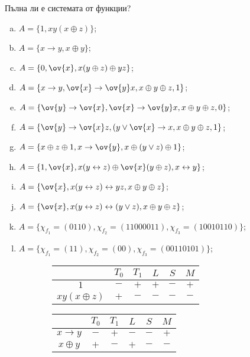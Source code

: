 \begin{problem} %
  Пълна ли е системата от функции?
  \begin{enumerate}[a)]
  \item
    $A = \{1, xy(x\oplus z)\}$;
  \item
    $A = \{x\rightarrow y, x\oplus y\}$;
  \item
    $A = \{0, \ov{x}, x(y\oplus z)\oplus yz\}$;
  \item
    $A = \{x\rightarrow y, \ov{x}\rightarrow \ov{y}x, x\oplus y\oplus z, 1\}$;
  \item
    $A = \{\ov{y}\rightarrow\ov{x}, \ov{x}\rightarrow \ov{y}x, x\oplus y\oplus z, 0\}$;
  \item
    $A = \{\ov{y}\rightarrow \ov{x}z, (y\vee \ov{x} \rightarrow x, x\oplus y\oplus z, 1\}$;
  \item
    $A = \{x\oplus z \oplus 1, x \to \ov{y}, x\oplus (y \vee z) \oplus 1\}$;
  \item
    $A = \{1,\ov{x}, x(y\leftrightarrow z)\oplus\ov{x}(y\oplus z), x\leftrightarrow y\}$;
  \item
    $A = \{\ov{x}, x(y\leftrightarrow z) \leftrightarrow yz, x \oplus y \oplus z\}$;
  \item
    $A = \{\ov{x}, x(y\leftrightarrow z) \leftrightarrow (y\vee z), x \oplus y \oplus z\}$;
  \item
    $A = \{\chi_{f_1} = (0110), \chi_{f_2} = (1100 0011), \chi_{f_3} = (1001 0110)\}$;
  \item
    $A = \{\chi_{f_1} = (11), \chi_{f_2} = (00), \chi_{f_3} = (0011 0101)\}$;
  \end{enumerate}
\end{problem}
\begin{solution}
  \begin{figure}[H]
    \begin{subfigure}[b]{0.5\textwidth}
      \begin{tabular}[b]{|c|c|c|c|c|c|}
        \hline
        & $T_0$ & $T_1$ & $L$ & $S$ & $M$\\
        \hline
        $1$ & $-$ & $+$ & $+$ & $-$ & $+$\\
        \hline
        $xy(x\oplus z)$ & $+$ & $-$ & $-$ & $-$ & $-$\\
        \hline
      \end{tabular}
      \caption{}      
    \end{subfigure}
    \begin{subfigure}[b]{0.5\textwidth}
      \begin{tabular}[b]{|c|c|c|c|c|c|}
        \hline
        & $T_0$ & $T_1$ & $L$ & $S$ & $M$\\
        \hline
        $x\rightarrow y$ & $-$ & $+$ & $-$ & $-$ & $+$\\
        \hline
        $x\oplus y$ & $+$ & $-$ & $+$ & $-$ & $-$\\
        \hline
      \end{tabular}
      \caption{}
    \end{subfigure}
  \end{figure}
\end{solution}

